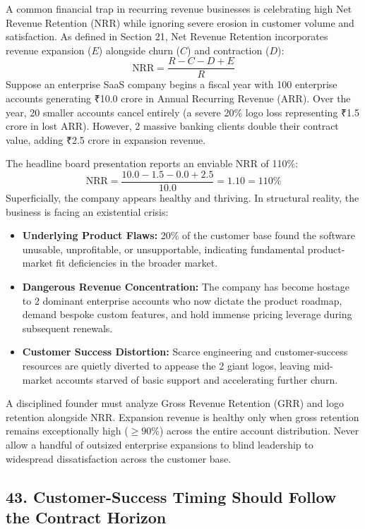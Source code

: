 A common financial trap in recurring revenue businesses is celebrating high Net Revenue Retention (NRR) while ignoring severe erosion in customer volume and satisfaction. As defined in Section 21, Net Revenue Retention incorporates revenue expansion ($E$) alongside churn ($C$) and contraction ($D$):
\begin{equation}
\text{NRR} = \frac{R - C - D + E}{R}
\end{equation}
Suppose an enterprise SaaS company begins a fiscal year with 100 enterprise accounts generating ₹10.0 crore in Annual Recurring Revenue (ARR). Over the year, 20 smaller accounts cancel entirely (a severe 20\% logo loss representing ₹1.5 crore in lost ARR). However, 2 massive banking clients double their contract value, adding ₹2.5 crore in expansion revenue. 

The headline board presentation reports an enviable NRR of 110\%:
\begin{equation}
\text{NRR} = \frac{10.0 - 1.5 - 0.0 + 2.5}{10.0} = 1.10 = 110\%
\end{equation}
Superficially, the company appears healthy and thriving. In structural reality, the business is facing an existential crisis:
\begin{itemize}[leftmargin=*]
\item \textbf{Underlying Product Flaws:} 20\% of the customer base found the software unusable, unprofitable, or unsupportable, indicating fundamental product-market fit deficiencies in the broader market.
\item \textbf{Dangerous Revenue Concentration:} The company has become hostage to 2 dominant enterprise accounts who now dictate the product roadmap, demand bespoke custom features, and hold immense pricing leverage during subsequent renewals.
\item \textbf{Customer Success Distortion:} Scarce engineering and customer-success resources are quietly diverted to appease the 2 giant logos, leaving mid-market accounts starved of basic support and accelerating further churn.
\end{itemize}

A disciplined founder must analyze Gross Revenue Retention (GRR) and logo retention alongside NRR. Expansion revenue is healthy only when gross retention remains exceptionally high ($\ge 90\%$) across the entire account distribution. Never allow a handful of outsized enterprise expansions to blind leadership to widespread dissatisfaction across the customer base.

\subsection*{43. Customer-Success Timing Should Follow the Contract Horizon}

